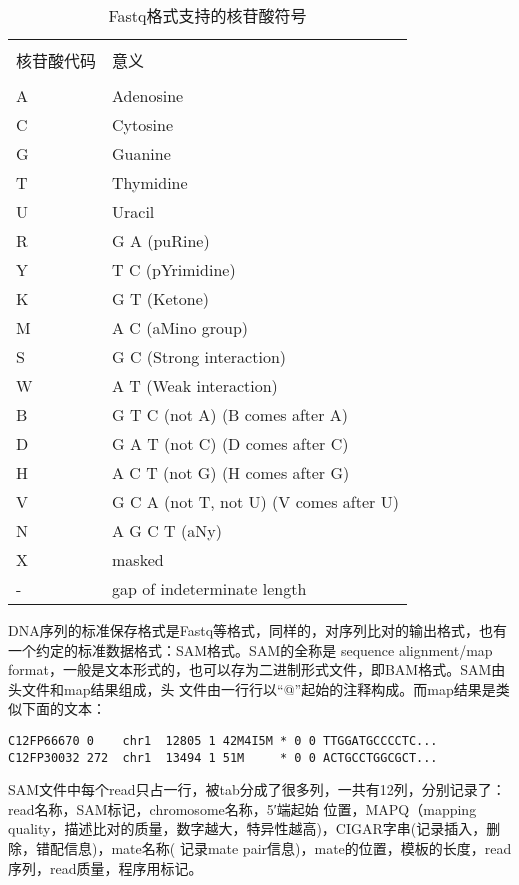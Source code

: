 \begin{table}[htbp]
    \caption{Fastq格式支持的核苷酸符号}
    \label{tab:tabatcg}
    \centering
    \begin{tabular}{ll}
        \hline\\
        核苷酸代码&意义\\
        \hline\\
        A & Adenosine \\
        C & Cytosine \\
        G & Guanine \\
        T & Thymidine \\
        U & Uracil \\
        R & G A (puRine) \\
        Y & T C (pYrimidine) \\
        K & G T (Ketone) \\
        M & A C (aMino group) \\
        S & G C (Strong interaction)\\
        W & A T (Weak interaction) \\
        B & G T C (not A) (B comes after A)\\
        D & G A T (not C) (D comes after C) \\
        H & A C T (not G) (H comes after G) \\
        V & G C A (not T, not U) (V comes after U)\\
        N & A G C T (aNy)\\
        X & masked \\
        - & gap of indeterminate length
    \end{tabular}
\end{table}

DNA序列的标准保存格式是Fastq等格式，同样的，对序列比对的输出格式，也有一个约定的标准数据格式：SAM格式。SAM的全称是
sequence alignment/map format，一般是文本形式的，也可以存为二进制形式文件，即BAM格式。SAM由头文件和map结果组成，头
文件由一行行以“@”起始的注释构成。而map结果是类似下面的文本：

\begin{verbatim}
C12FP66670 0    chr1  12805 1 42M4I5M * 0 0 TTGGATGCCCCTC...
C12FP30032 272  chr1  13494 1 51M     * 0 0 ACTGCCTGGCGCT...
\end{verbatim}

SAM文件中每个read只占一行，被tab分成了很多列，一共有12列，分别记录了：read名称，SAM标记，chromosome名称，5′端起始
位置，MAPQ（mapping quality，描述比对的质量，数字越大，特异性越高)，CIGAR字串(记录插入，删除，错配信息)，mate名称(
记录mate pair信息)，mate的位置，模板的长度，read序列，read质量，程序用标记。

